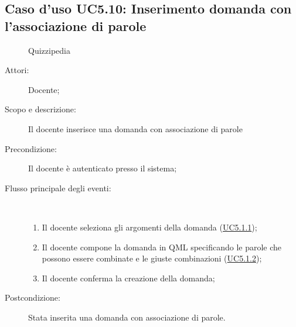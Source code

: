 \subsection{Caso d'uso UC5.10: Inserimento domanda con l'associazione di parole}
	\begin{figure}[H]
		\centering
		\begin{resizedtikzpicture}{\textwidth}
		\begin{umlsystem}[x=0, fill=lightgray!20]{Quizzipedia}
		\end{umlsystem}
		\end{resizedtikzpicture}
		\caption{}
	\end{figure}
\begin{description}
\item[Attori:] Docente;
\item[Scopo e descrizione:] Il docente inserisce una domanda con associazione di parole
      \item[Precondizione:] Il docente è autenticato presso il sistema;

        \item[Flusso principale degli eventi:] \ 
 \begin{enumerate}
          \item Il docente seleziona gli argomenti della domanda (\hyperlink{UC5.1.1}{UC5.1.1});
          \item Il docente compone la domanda in QML specificando le parole che possono essere combinate e le giuste combinazioni (\hyperlink{UC5.1.2}{UC5.1.2});
          \item Il docente conferma la creazione della domanda;

      \end{enumerate}
    \item[Postcondizione:] Stata inserita una domanda con associazione di parole.
  \end{description}
\hypertarget{UC5.11}{}
